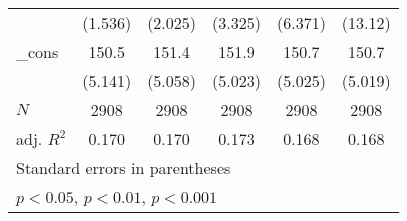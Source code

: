 {\begin{tabular}{l*{5}{c}}
            &     (1.536)         &     (2.025)         &     (3.325)         &     (6.371)         &     (13.12)         \\
[1em]
\_cons      &       150.5\sym{***}&       151.4\sym{***}&       151.9\sym{***}&       150.7\sym{***}&       150.7\sym{***}\\
            &     (5.141)         &     (5.058)         &     (5.023)         &     (5.025)         &     (5.019)         \\
\hline
\(N\)       &        2908         &        2908         &        2908         &        2908         &        2908         \\
adj. \(R^{2}\)&       0.170         &       0.170         &       0.173         &       0.168         &       0.168         \\
\hline\hline
\multicolumn{6}{l}{\footnotesize Standard errors in parentheses}\\
\multicolumn{6}{l}{\footnotesize \sym{*} \(p<0.05\), \sym{**} \(p<0.01\), \sym{***} \(p<0.001\)}\\
\end{tabular}
}

